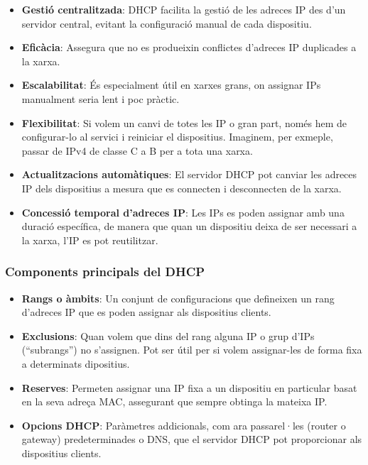 \documentclass[
  a4paper,
]{article}
\providecommand{\tightlist}{%
  \setlength{\itemsep}{0pt}\setlength{\parskip}{0pt}}
\begin{document}
\begin{itemize}
\tightlist
\item
  \textbf{Gestió centralitzada}: DHCP facilita la gestió de les adreces
  IP des d'un servidor central, evitant la configuració manual de cada
  dispositiu.
\item
  \textbf{Eficàcia}: Assegura que no es produeixin conflictes d'adreces
  IP duplicades a la xarxa.
\item
  \textbf{Escalabilitat}: És especialment útil en xarxes grans, on
  assignar IPs manualment seria lent i poc pràctic.
\item
  \textbf{Flexibilitat}: Si volem un canvi de totes les IP o gran part,
  només hem de configurar-lo al servici i reiniciar el dispositius.
  Imaginem, per exmeple, passar de IPv4 de classe C a B per a tota una
  xarxa.
\item
  \textbf{Actualitzacions automàtiques}: El servidor DHCP pot canviar
  les adreces IP dels dispositius a mesura que es connecten i
  desconnecten de la xarxa.
\item
  \textbf{Concessió temporal d'adreces IP}: Les IPs es poden assignar
  amb una duració específica, de manera que quan un dispositiu deixa de
  ser necessari a la xarxa, l'IP es pot reutilitzar.
\end{itemize}

\subsubsection{Components principals del
DHCP}\label{components-principals-del-dhcp}

\begin{itemize}
\item
  \textbf{Rangs o àmbits}: Un conjunt de configuracions que defineixen
  un rang d'adreces IP que es poden assignar als dispositius clients.
\item
  \textbf{Exclusions}: Quan volem que dins del rang alguna IP o grup
  d'IPs (``subrangs'') no s'assignen. Pot ser útil per si volem
  assignar-les de forma fixa a determinats dipositius.
\item
  \textbf{Reserves}: Permeten assignar una IP fixa a un dispositiu en
  particular basat en la seva adreça MAC, assegurant que sempre obtinga
  la mateixa IP.
\item
  \textbf{Opcions DHCP}: Paràmetres addicionals, com ara passarel·les
  (router o gateway) predeterminades o DNS, que el servidor DHCP pot
  proporcionar als dispositius clients.
\end{itemize}
\end{document}
